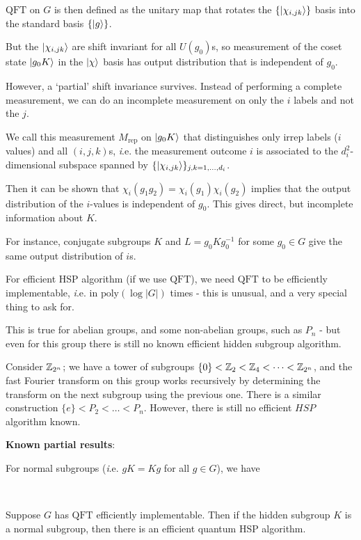 \documentclass[]{article}
\renewcommand{\it}[1]{\textit{#1}}
\newcommand{\qft}{\textrm{QFT}}
\newcommand{\poly}{\textrm{poly}}
\begin{document}
\begin{remark*}[Remarks on HSP for {\it non}-abelian groups $G$]
$\qft$ on $G$ is then defined as the unitary map that rotates the $\{\lvert\chi_{i,jk}\rangle\}$ basis into the standard basis $\{\lvert g\rangle\}$.

But the $\lvert\chi_{i,jk}\rangle$ are  shift invariant for all $U(g_0)$s, so measurement of the coset state $\lvert g_0 K\rangle$ in the $\lvert\chi\rangle$ basis has output distribution that is  independent of $g_0$.

However, a `partial' shift invariance survives. Instead of performing a complete measurement, we can do an incomplete measurement on only the $i$ labels and not the $j$.

We call this measurement $M_{\textrm{rep}}$ on $\lvert g_0 K\rangle$ that distinguishes only irrep labels ($i$ values) and  all $(i,j,k)$s, {\it i.e.} the measurement outcome $i$ is associated to the $d_i^2$-dimensional subspace spanned by $\{\lvert\chi_{i,jk}\rangle\}_{j,k=1,\dots,d_i}$.

Then it can be shown that $\chi_i(g_1g_2) = \chi_i(g_1)\chi_i(g_2)$ implies that the output distribution of the $i$-values is independent of $g_0$. This gives direct, but incomplete information about $K$.

For instance, conjugate subgroups $K$ and $L = g_0 Kg_0^{-1}$ for some $g_0 \in G$ give the same output distribution of $i$s.


For efficient HSP algorithm (if we use $\qft$), we need $\qft$ to be efficiently implementable, {\it i.e.} in $\poly(\log|G|)$ times - this is unusual, and a very special thing to ask for.

This is true for abelian groups, and some non-abelian groups, such as $P_n$ - but even for this group there is still no known efficient hidden subgroup algorithm.

Consider $\mathbb{Z}_{2^n}$; we have a tower of subgroups $\{0\} < \mathbb{Z}_2 < \mathbb{Z}_4 <\dots < \mathbb{Z}_{2^n}$, and the fast Fourier transform on this group works recursively by determining the transform on the next subgroup using the previous one. There is a similar construction $\{e\}<P_2 <\dots < P_n$. However, there is still no efficient $HSP$ algorithm known.

\textbf{Known partial results}:

For normal subgroups ({\it i.e.} $gK = Kg$ for all $g\in G$), we have
\begin{theorem*}\ 

Suppose $G$ has $\qft$ efficiently implementable. Then if the hidden subgroup $K$ is a normal subgroup, then there is an efficient quantum HSP algorithm.
\end{theorem*}


\end{remark*}
\end{document}
